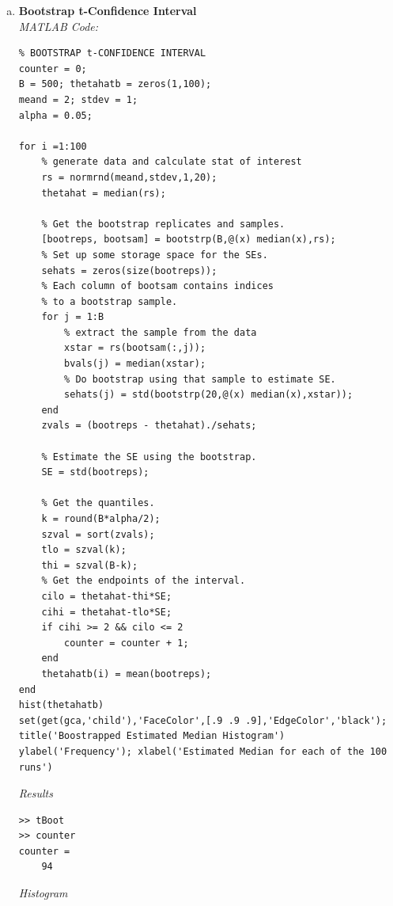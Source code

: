 \documentclass[12pt,a4paper]{article}
\begin{document}
\begin{enumerate}[a)]
\item{\textbf{Bootstrap t-Confidence Interval}\\
\textit{MATLAB Code:}\\
\begin{verbatim}
% BOOTSTRAP t-CONFIDENCE INTERVAL
counter = 0;
B = 500; thetahatb = zeros(1,100);
meand = 2; stdev = 1;
alpha = 0.05;

for i =1:100
    % generate data and calculate stat of interest
    rs = normrnd(meand,stdev,1,20);
    thetahat = median(rs);
    
    % Get the bootstrap replicates and samples.
    [bootreps, bootsam] = bootstrp(B,@(x) median(x),rs);
    % Set up some storage space for the SEs.
    sehats = zeros(size(bootreps));
    % Each column of bootsam contains indices
    % to a bootstrap sample.
    for j = 1:B
        % extract the sample from the data
        xstar = rs(bootsam(:,j));
        bvals(j) = median(xstar);
        % Do bootstrap using that sample to estimate SE.
        sehats(j) = std(bootstrp(20,@(x) median(x),xstar));
    end
    zvals = (bootreps - thetahat)./sehats;
    
    % Estimate the SE using the bootstrap.
    SE = std(bootreps);
    
    % Get the quantiles.
    k = round(B*alpha/2);
    szval = sort(zvals);
    tlo = szval(k);
    thi = szval(B-k);
    % Get the endpoints of the interval.
    cilo = thetahat-thi*SE;
    cihi = thetahat-tlo*SE;
    if cihi >= 2 && cilo <= 2
        counter = counter + 1;
    end
    thetahatb(i) = mean(bootreps);
end
hist(thetahatb)
set(get(gca,'child'),'FaceColor',[.9 .9 .9],'EdgeColor','black');
title('Boostrapped Estimated Median Histogram')
ylabel('Frequency'); xlabel('Estimated Median for each of the 100 runs')
\end{verbatim}
\textit{Results}\\
\begin{verbatim}
>> tBoot
>> counter
counter =
    94
\end{verbatim}

\textit{Histogram}

}
\end{enumerate}
\end{document}
